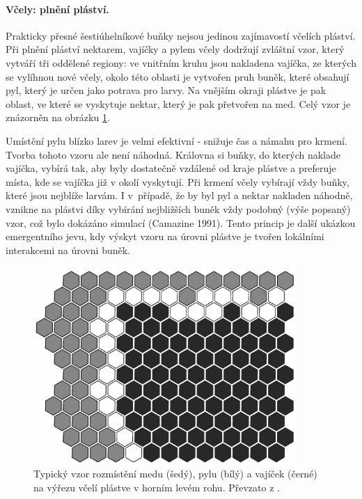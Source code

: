 \documentclass[a4paper,12pt]{article}
\begin{document}
\paragraph{Včely: plnění pláství.}
Prakticky přesné šestiúhelníkové buňky nejsou jedinou zajímavostí včelích pláství. Při plnění
pláství nektarem, vajíčky a pylem včely dodržují zvláštní vzor, který vytváří tři oddělené
regiony: ve vnitřním kruhu jsou nakladena vajíčka, ze kterých se vylíhnou nové včely, okolo
této oblasti je vytvořen pruh buněk, které obsahují pyl, který je určen jako potrava pro larvy.
Na vnějším okraji plástve je pak oblast, ve které se vyskytuje nektar, který je pak přetvořen
na med. Celý vzor je znázorněn na obrázku \ref{fig-honeycomb}.

Umístění pylu blízko larev je velmi efektivní - snižuje čas a námahu pro krmení. Tvorba
tohoto vzoru ale není náhodná. Královna si buňky, do kterých naklade vajíčka, vybírá tak, aby
byly dostatečně vzdálené od kraje plástve a preferuje místa, kde se vajíčka již v okolí vyskytují.
Při krmení včely vybírají vždy buňky, které jsou nejblíže larvám. I v~případě, že by byl pyl
a nektar nakladen náhodně, vznikne na plástvi díky vybírání nejbližších buněk vždy podobný
(výše popsaný) vzor, což bylo dokázáno simulací (Camazine 1991). Tento princip je další ukázkou
emergentního jevu, kdy výskyt vzoru na úrovni plástve je tvořen lokálními interakcemi na úrovni
buněk.

\begin{figure}[here]
  \centering
  \includegraphics[width=10cm]{./img/comb.png}
  \caption{Typický vzor rozmístění medu (šedý), pylu (bílý) a vajíček (černé) na výřezu
   včelí plástve v horním levém rohu. Převzato z \cite{Beekman08SwarmBio}.}
  \label{fig-honeycomb}
\end{figure}
\end{document}
